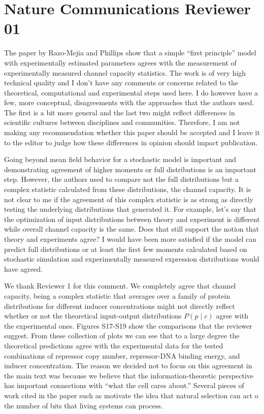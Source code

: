 \section{Nature Communications Reviewer 01}

The paper by Razo-Mejia and Phillips show that a simple “first principle” model
with experimentally estimated parameters agrees with the measurement of
experimentally measured channel capacity statistics. The work is of very high
technical quality and I don’t have any comments or concerns related to the
theoretical, computational and experimental steps used here. I do however have a
few, more conceptual, disagreements with the approaches that the authors used.
The first is a bit more general and the last two might reflect differences in
scientific cultures between disciplines and communities. Therefore, I am not
making any recommendation whether this paper should be accepted and I leave it
to the editor to judge how these differences in opinion should impact
publication.

\begin{tcolorbox}
Going beyond mean field behavior for a stochastic model is important and
demonstrating agreement of higher moments or full distributions is an important
step. However, the authors used to compare not the full distributions but a
complex statistic calculated from these distributions, the channel capacity. It
is not clear to me if the agreement of this complex statistic is as strong as
directly testing the underlying distributions that generated it. For example,
let's say that the optimization of input distributions between theory and
experiment is different while overall channel capacity is the same. Does that
still support the notion that theory and experiments agree? I would have been
more satisfied if the model can predict full distributions or at least the first
few moments calculated based on stochastic simulation and experimentally
measured expression distributions would have agreed.
\end{tcolorbox}

We thank Reviewer 1 for this comment. We completely agree that channel capacity,
being a complex statistic that averages over a family of protein distributions
for different inducer concentrations might not directly reflect whether or not
the theoretical input-output distributions $P(p \mid c)$ agree with the
experimental ones. Figures S17-S19 show the comparisons that the reviewer
suggest. From these collection of plots we can see that to a large degree the
theoretical predictions agree with the experimental data for the tested
combinations of repressor copy number, repressor-DNA binding energy, and
inducer concentration. The reason we decided not to focus on this agreement in
the main text was because we believe that the information-theoretic perspective
has important connections with ``what the cell cares about.'' Several pieces of
work cited in the paper such as \cite{Bergstrom2004, Taylor2007, Tkacik2008,
Nemenman2010} motivate the idea that natural selection can act o the number of
bits that living systems can process.

